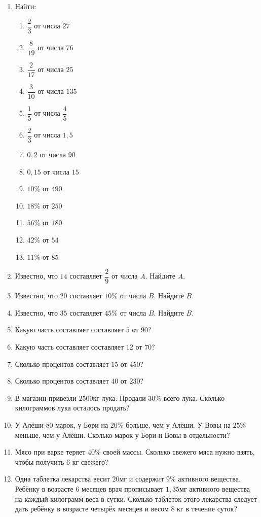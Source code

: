 \documentclass[12pt, a4paper]{article}
\begin{document}
   \cfoot{}
\begin{enumerate}
	\item Найти:
	\begin{multicols}{3}
		\begin{enumerate}[label=\asbuk*)]
			\item $\dfrac{2}{3}$ от числа $27$
			\item $\dfrac{8}{19}$ от числа $76$
			\item $\dfrac{2}{17}$ от числа $25$
			\item $\dfrac{3}{10}$ от числа $135$
			\item $\dfrac{1}{5}$ от числа $\dfrac{4}{5}$
			\item $\dfrac{2}{3}$ от числа $1,5$
			\item $0,2$ от числа $90$
			\item $0,15$ от числа $15$
			\item $10\%$ от $490$
			\item $18\%$ от $250$
			\item $56\%$ от $180$
			\item $42\%$ от $54$
			\item $11\%$ от $85$
		\end{enumerate}
	\end{multicols}
	\item Известно, что $14$ составляет $\dfrac{2}{9}$ от числа $A$. Найдите $A$.
	\item Известно, что $20$ составляет $10\%$ от числа $B$. Найдите $B$.
	\item Известно, что $35$ составляет $45\%$ от числа $B$. Найдите $B$.
	\item Какую часть составляет составляет $5$ от $90$?
	\item Какую часть составляет составляет $12$ от $70$?
	\item Сколько процентов составляет $15$ от $450$?
	\item Сколько процентов составляет $40$ от $230$?
	\item В магазин привезли $2500$кг лука. Продали $30\%$ всего лука. Сколько килограммов лука осталось продать?
	\item У Алёши $80$ марок, у Бори на $20\%$ больше, чем у Алёши. У Вовы на $25\%$ меньше, чем у Алёши. Сколько марок у Бори и Вовы в отдельности?
	\item Мясо при варке теряет $40\%$ своей массы. Сколько свежего мяса нужно взять, чтобы получить $6$ кг свежего?
	\item Одна таблетка лекарства весит $20$мг и содержит $9\%$ активного вещества. Ребёнку в возрасте $6$ месяцев врач прописывает $1,35$мг активного вещества на каждый килограмм веса в сутки. Сколько таблеток этого лекарства следует дать ребёнку в возрасте четырёх месяцев и весом 8 кг в течение суток?

\end{enumerate}
\end{document}
